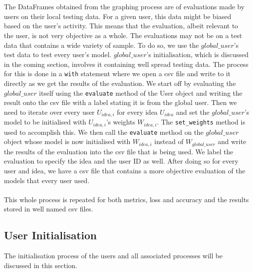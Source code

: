 \documentclass[12pt]{article}
\begin{document}
\\\\
The DataFrames obtained from the graphing process are of evaluations made by users on their local testing data. For a given user, this data might be biased based on the user's activity. This means that the evaluation, albeit relevant to the user, is not very objective as a whole. The evaluations may not be on a test data that contains a wide variety of sample. To do so, we use the $global\_user$'s test data to test every user's model. $global\_user$'s initialisation, which is discussed in the coming section, involves it containing well spread testing data. The process for this is done in a \texttt{with} statement where we open a csv file and write to it directly as we get the results of the evaluation. We start off by evaluating the $global\_user$ itself using the \texttt{evaluate} method of the User object and writing the result onto the csv file with a label stating it is from the global user. Then we need to iterate over every user $U_{idea,i}$ for every idea $U_{idea}$ and set the $global\_user$'s model to be initialised with $U_{idea,i}$'s weights $W_{idea,i}$. The \texttt{set\_weights} method is used to accomplish this. We then call the \texttt{evaluate} method on the $global\_user$ object whose model is now initialised with $W_{idea,i}$ instead of $W_{global\_user}$ and write the results of the evaluation into the csv file that is being used. We label the evaluation to specify the idea and the user ID as well. After doing so for every user and idea, we have a csv file that contains a more objective evaluation of the models that every user used. 
\\\\
This whole process is repeated for both metrics, loss and accuracy and the results stored in well named csv files. 
\subsection{User Initialisation}
The initialisation process of the users and all associated processes will be discussed in this section.
\end{document}
